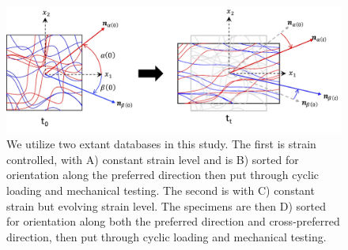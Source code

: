 \begin{figure}[hbt]
\centering
\includegraphics[width=0.6\paperwidth]{Images/chapter4/figure4}
\caption{We utilize two extant databases in this study. The first is strain controlled, with A) constant strain level and is B) sorted for orientation along the preferred direction then put through cyclic loading and mechanical testing. The second is with C) constant strain but evolving strain level. The specimens are then D) sorted for orientation along both the preferred direction and cross-preferred direction, then put through cyclic loading and mechanical testing.}
\label{fig:database}
\end{figure}